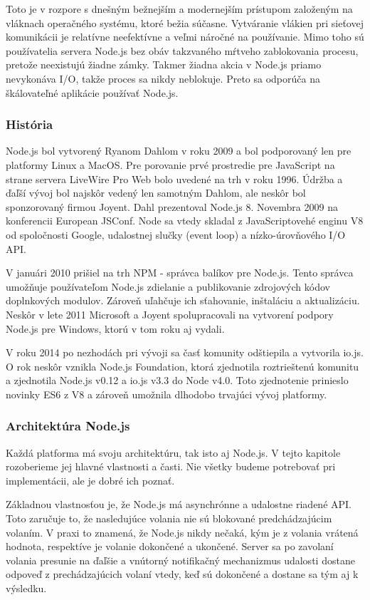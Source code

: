\indent Toto je v rozpore s dnešným bežnejším a modernejším prístupom založeným na vláknach operačného systému, ktoré bežia súčasne. Vytváranie vlákien pri sieťovej komunikácii je relatívne neefektívne a veľmi náročné na používanie. Mimo toho sú používatelia servera Node.js bez obáv takzvaného mŕtveho zablokovania procesu, pretože neexistujú žiadne zámky. Takmer žiadna akcia v Node.js priamo nevykonáva I/O, takže proces sa nikdy neblokuje. Preto sa odporúča na škálovateľné aplikácie používať Node.js.

\subsubsection{História}
\indent Node.js bol vytvorený Ryanom Dahlom v roku 2009 a bol podporovaný len pre platformy Linux a MacOS. Pre porovanie prvé prostredie pre JavaScript na strane servera LiveWire Pro Web bolo uvedené na trh v roku 1996. Údržba a ďaľší vývoj bol najskôr vedený len samotným Dahlom, ale neskôr bol sponzorovaný firmou Joyent. Dahl prezentoval Node.js 8. Novembra 2009 na konferencii European JSConf. Node sa vtedy skladal z JavaScriptovehé enginu V8 od spoločnosti Google, udalostnej slučky (event loop) a nízko-úrovňového I/O API.

\indent V januári 2010 prišiel na trh NPM - správca balíkov pre Node.js. Tento správca umožňuje používateľom Node.js zdielanie a publikovanie zdrojových kódov doplnkových modulov. Zároveň uľahčuje ich sťahovanie, inštaláciu a aktualizáciu. Neskôr v lete 2011 Microsoft a Joyent spolupracovali na vytvorení podpory Node.js pre Windows, ktorú v tom roku aj vydali. 

\indent V roku 2014 po nezhodách pri vývoji sa časť komunity odštiepila a vytvorila io.js. O rok neskôr vznikla Node.js Foundation, ktorá zjednotila roztrieštenú komunitu a zjednotila Node.js v0.12 a io.js v3.3 do Node v4.0. Toto zjednotenie prinieslo novinky ES6 z V8 a zároveň umožnila dlhodobo trvajúci vývoj platformy.

\subsubsection{Architektúra Node.js}
\indent Každá platforma má svoju architektúru, tak isto aj Node.js. V tejto kapitole rozoberieme jej hlavné vlastnosti a časti. Nie všetky budeme potrebovať pri implementácii, ale je dobré ich poznať.

\indent Základnou vlastnosťou je, že Node.js má asynchrónne a udalostne riadené API. Toto zaručuje to, že nasledujúce volania nie sú blokované predchádzajúcim volaním. V praxi to znamená, že Node.js nikdy nečaká, kým je z volania vrátená hodnota, respektíve je volanie dokončené a ukončené. Server sa po zavolaní volania presunie na ďaľšie a vnútorný notifikačný mechanizmus udalosti dostane odpoveď z prechádzajúcich volaní vtedy, keď sú dokončené a dostane sa tým aj k výsledku. 

